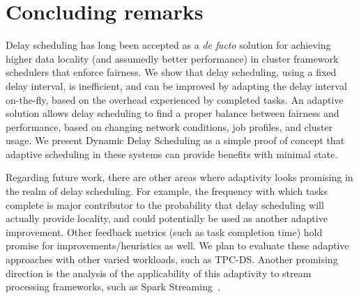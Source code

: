 \section{Concluding remarks}\label{sec:conclusion}

Delay scheduling has long been accepted as a \textit{de facto} solution for achieving
higher data locality (and assumedly better performance) in cluster framework schedulers that
enforce fairness. We show that 
delay scheduling, using a fixed delay interval, is inefficient, and can be improved by 
adapting the delay interval on-the-fly, based on the overhead experienced by completed tasks. 
An adaptive solution allows delay scheduling to find a proper balance between fairness and
performance, based on changing network conditions, job profiles, and cluster usage.
We present Dynamic Delay Scheduling as a simple proof of concept that adaptive scheduling
in these systems can provide benefits with minimal state.

Regarding future work, there are other areas where adaptivity looks promising in the realm of
delay scheduling. For example, the frequency with which tasks complete is major contributor
to the probability that delay scheduling will actually provide locality, and could potentially
be used as another adaptive improvement. Other feedback metrics (such as task completion time) 
hold promise for improvements/heuristics as well. We plan to evaluate these adaptive approaches
with other varied workloads, such as TPC-DS. Another promising direction is the analysis of the applicability
of this adaptivity to stream processing frameworks, such as Spark Streaming~\cite{Zaharia:2013str}.
